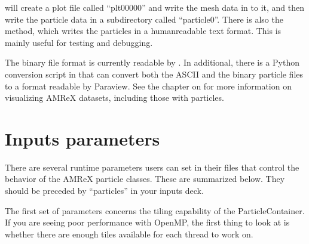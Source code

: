 \documentclass[letterpaper,10pt,english]{sphinxmanual}
\begin{document}
\begin{sphinxVerbatim}[commandchars=\\\{\}]
  
                            
 
\end{sphinxVerbatim}

\sphinxAtStartPar
will create a plot file called “plt00000” and write the mesh data in  to it, and then write the particle data in a subdirectory called “particle0”. There is also the  method, which writes the particles in a human\sphinxhyphen{}readable text format. This is mainly useful for testing and debugging.

\sphinxAtStartPar
The binary file format is currently readable by . In additional, there is a Python conversion script in
 that can convert both the ASCII and the binary particle files to a
format readable by Paraview. See the chapter on {\hyperref[\detokenize{Visualization_Chapter:chap-visualization}]{}} for more information on visualizing AMReX datasets, including those with particles.


\section{Inputs parameters}
\label{\detokenize{Particle:inputs-parameters}}\label{\detokenize{Particle:sec-particles-parameters}}
\sphinxAtStartPar
There are several runtime parameters users can set in their  files that control the
behavior of the AMReX particle classes. These are summarized below. They should be preceded by
“particles” in your inputs deck.

\sphinxAtStartPar
The first set of parameters concerns the tiling capability of the ParticleContainer. If you are seeing poor performance
with OpenMP, the first thing to look at is whether there are enough tiles available for each thread to work on.
\end{document}

